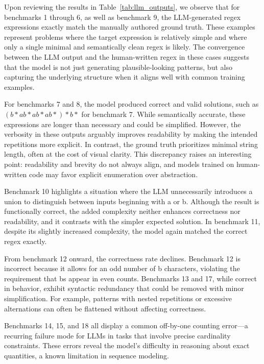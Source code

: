 \indent\indent Upon reviewing the results in Table~\ref{tab:llm_outputs}, we observe that for benchmarks 1 through 6, as well as benchmark 9, the LLM-generated regex expressions exactly match the manually authored ground truth. These examples represent problems where the target expression is relatively simple and where only a single minimal and semantically clean regex is likely. The convergence between the LLM output and the human-written regex in these cases suggests that the model is not just generating plausible-looking patterns, but also capturing the underlying structure when it aligns well with common training examples.

\indent\indent For benchmarks 7 and 8, the model produced correct and valid solutions, such as $(b*ab*ab*ab*)*b*$ for benchmark 7. While semantically accurate, these expressions are longer than necessary and could be simplified. However, the verbosity in these outputs arguably improves readability by making the intended repetitions more explicit. In contrast, the ground truth prioritizes minimal string length, often at the cost of visual clarity. This discrepancy raises an interesting point: readability and brevity do not always align, and models trained on human-written code may favor explicit enumeration over abstraction.

\indent\indent Benchmark 10 highlights a situation where the LLM unnecessarily introduces a union to distinguish between inputs beginning with a or b. Although the result is functionally correct, the added complexity neither enhances correctness nor readability, and it contrasts with the simpler expected solution. In benchmark 11, despite its slightly increased complexity, the model again matched the correct regex exactly.

\indent\indent From benchmark 12 onward, the correctness rate declines. Benchmark 12 is incorrect because it allows for an odd number of b characters, violating the requirement that bs appear in even counts. Benchmarks 13 and 17, while correct in behavior, exhibit syntactic redundancy that could be removed with minor simplification. For example, patterns with nested repetitions or excessive alternations can often be flattened without affecting correctness.

\indent\indent Benchmarks 14, 15, and 18 all display a common off-by-one counting error—a recurring failure mode for LLMs in tasks that involve precise cardinality constraints. These errors reveal the model's difficulty in reasoning about exact quantities, a known limitation in sequence modeling.

